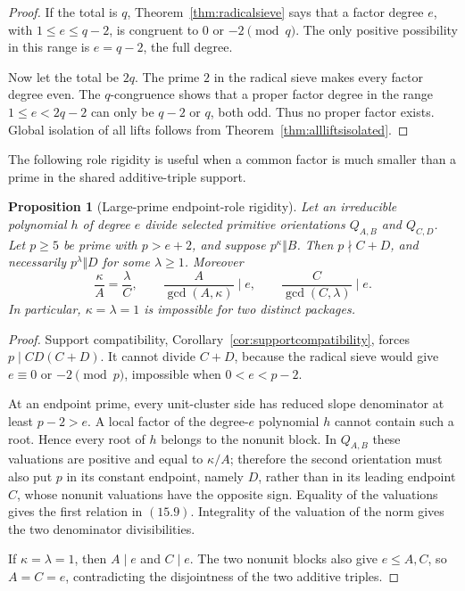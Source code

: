 \documentclass[11pt]{article}
\newtheorem{proposition}[theorem]{Proposition}
\theoremstyle{definition}
\begin{document}
\begin{proof}
If the total is \(q\), Theorem~\ref{thm:radicalsieve} says that a factor
degree \(e\), with \(1\leq e\leq q-2\), is congruent to \(0\) or
\(-2\pmod q\).  The only positive possibility in this range is
\(e=q-2\), the full degree.

Now let the total be \(2q\).  The prime \(2\) in the radical sieve makes
every factor degree even.  The \(q\)-congruence shows that a proper factor
degree in the range \(1\leq e<2q-2\) can only be \(q-2\) or \(q\), both
odd.  Thus no proper factor exists.  Global isolation of all lifts follows
from Theorem~\ref{thm:allliftsisolated}.
\end{proof}

The following role rigidity is useful when a common factor is much smaller
than a prime in the shared additive-triple support.

\begin{proposition}[Large-prime endpoint-role rigidity]
\label{prop:largerole}
Let an irreducible polynomial \(h\) of degree \(e\) divide selected
primitive orientations \(Q_{A,B}\) and \(Q_{C,D}\).  Let \(p\geq5\) be
prime with \(p>e+2\), and suppose \(p^\kappa\Vert B\).  Then
\(p\nmid C+D\), and necessarily \(p^\lambda\Vert D\) for some
\(\lambda\geq1\).  Moreover
\begin{equation}
 \frac{\kappa}{A}=\frac{\lambda}{C},
 \qquad
 \frac{A}{\gcd(A,\kappa)}\mid e,
 \qquad
 \frac{C}{\gcd(C,\lambda)}\mid e.
 \tag{15.9}
\end{equation}
In particular, \(\kappa=\lambda=1\) is impossible for two distinct
packages.
\end{proposition}

\begin{proof}
Support compatibility, Corollary~\ref{cor:supportcompatibility}, forces
\(p\mid CD(C+D)\).  It cannot divide \(C+D\), because the radical sieve
would give \(e\equiv0\) or \(-2\pmod p\), impossible when
\(0<e<p-2\).

At an endpoint prime, every unit-cluster side has reduced slope denominator
at least \(p-2>e\).  A local factor of the degree-\(e\) polynomial \(h\)
cannot contain such a root.  Hence every root of \(h\) belongs to the
nonunit block.  In \(Q_{A,B}\) these valuations are positive and equal to
\(\kappa/A\); therefore the second orientation must also put \(p\) in its
constant endpoint, namely \(D\), rather than in its leading endpoint
\(C\), whose nonunit valuations have the opposite sign.  Equality of the
valuations gives the first relation in \((15.9)\).  Integrality of the
valuation of the norm gives the two denominator divisibilities.

If \(\kappa=\lambda=1\), then \(A\mid e\) and \(C\mid e\).  The two
nonunit blocks also give \(e\leq A,C\), so \(A=C=e\), contradicting the
disjointness of the two additive triples.
\end{proof}
\end{document}
